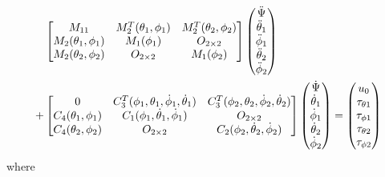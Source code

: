\begin{align}
    &\begin{bmatrix}
        M_{11}      &{M_2^T(\theta_1,\phi_1)}      &M_2^T(\theta_2,\phi_2)\\
        M_2(\theta_1,\phi_1)      &{M_1(\phi_1)}   &O_{2\times2}\\
        M_2(\theta_2,\phi_2)      &O_{2\times2}    &M_1(\phi_2)
    \end{bmatrix}
\begin{pmatrix}
\ddot{\Psi}\\
\ddot{\theta}_1\\
\ddot{\phi}_1\\
\ddot{\theta}_2\\
\ddot{\phi}_2
\end{pmatrix}\notag\\
+
    &\begin{bmatrix}
        0           &C_3^T(\phi_1,\theta_1,\dot{\phi}_1,\dot{\theta}_1)     &C_3^T(\phi_2,\theta_2,\dot{\phi}_2,\dot{\theta}_2)     \\
        C_4(\theta_1,\phi_1)      &C_1(\phi_1,\dot{\theta}_1,\dot{\phi}_1)   &O_{2\times2}\\
        C_4(\theta_2,\phi_2)      &O_{2\times2}          &C_2(\phi_2,\dot{\theta}_2,\dot{\phi}_2)
    \end{bmatrix}
\begin{pmatrix}
\dot{\Psi}\\
\dot{\theta}_1\\
\dot{\phi}_1\\
\dot{\theta}_2\\
\dot{\phi}_2
\end{pmatrix}
=
\begin{pmatrix}
u_0\\
\tau_{\theta1}\\
\tau_{\phi1}\\
\tau_{\theta2}\\
\tau_{\phi2}
\end{pmatrix}\label{eq:3bodymodel}
\end{align}
where
